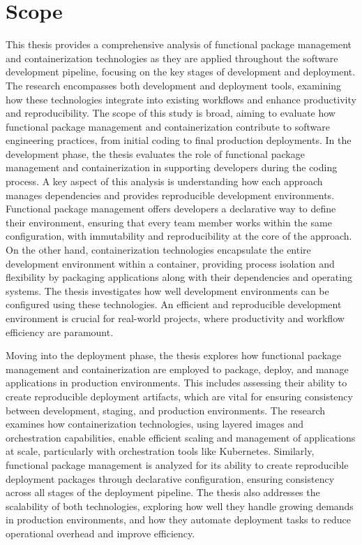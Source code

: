 \section{Scope}

This thesis provides a comprehensive analysis of functional package management and
containerization technologies as they are applied throughout the software development
pipeline, focusing on the key stages of development and deployment. The
research encompasses both development and deployment tools, examining how these
technologies integrate into existing workflows and enhance productivity and reproducibility.
The scope of this study is broad, aiming to evaluate how functional package management
and containerization contribute to software engineering practices, from initial coding
to final production deployments.
In the development phase, the thesis evaluates the role of functional package management
and containerization in supporting developers during the coding process. A key aspect
of this analysis is understanding how each approach manages dependencies and provides
reproducible development environments. Functional package management offers developers
a declarative way to define their environment, ensuring that every team member works
within the same configuration, with immutability and reproducibility at the core of the
approach. On the other hand, containerization technologies encapsulate the entire
development environment within a container, providing process isolation and flexibility
by packaging applications along with their dependencies and operating systems. The thesis
investigates how well development environments can be configured using these technologies. 
An efficient and reproducible development environment is crucial for real-world projects, 
where productivity and workflow efficiency are paramount.

Moving into the deployment phase, the thesis explores how functional package management
and containerization are employed to package, deploy, and manage applications in production
environments. This includes assessing their ability to create reproducible deployment
artifacts, which are vital for ensuring consistency between development, staging, and
production environments. The research examines how containerization technologies, using
layered images and orchestration capabilities, enable efficient scaling and management
of applications at scale, particularly with orchestration tools like Kubernetes. Similarly,
functional package management is analyzed for its ability to create reproducible deployment
packages through declarative configuration, ensuring consistency across all stages of the
deployment pipeline. The thesis also addresses the scalability of both technologies,
exploring how well they handle growing demands in production environments, and how they
automate deployment tasks to reduce operational overhead and improve efficiency.

